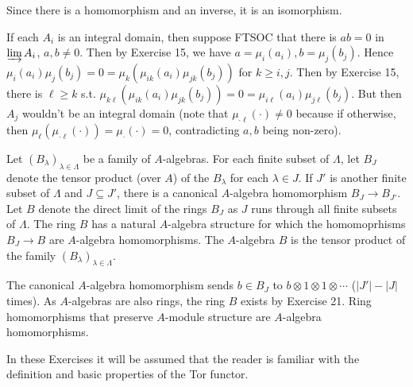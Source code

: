 \begin{questions}
\begin{solution}
		Since there is a homomorphism and an inverse, it is an isomorphism.

		If each $A_i$ is an integral domain, then suppose FTSOC that there is $ab = 0$ in $\varinjlim A_i $, $a,b\ne 0$.
		Then by Exercise 15, we have $a = \mu_i(a_i),b=\mu_j(b_j)$.
		Hence $\mu _i(a_i)\mu _j(b_j) = 0 = \mu _k(\mu _{ik}(a_i)\mu _{jk}(b_j))$ for $k\ge i,j$.
		Then by Exercise 15, there is $\ell\ge k$ s.t. $\mu _{k\ell}(\mu _{ik}(a_i)\mu _{jk}(b_j)) = 0 = \mu _{i\ell}(a_i)\mu _{j\ell}(b_j)$.
		But then $A_j$ wouldn't be an integral domain (note that $\mu _{\cdot \ell}(\cdot) \ne 0$ because if otherwise, then $\mu _\ell(\mu _{\cdot \ell}(\cdot)) = \mu_{\cdot}(\cdot) = 0$, contradicting $a,b$ being non-zero).
	\end{solution}

	\question Let $(B_{\lambda })_{\lambda \in \Lambda}$ be a family of $A$-algebras. For each finite subset of $\Lambda $, let $B_J$ denote the tensor product (over $A $) of the $B_{\lambda}$ for each $\lambda \in J$. If $J'$ is another finite subset of $\Lambda$ and $J\subseteq J' $, there is a canonical $A$-algebra homomorphism $B_J\to B_{J'}$. Let $B$ denote the direct limit of the rings $B_J$ as $J$ runs through all finite subsets of $\Lambda$. The ring $B$ has a natural $A$-algebra structure for which the homomoprhisms $B_J\to B$ are $A$-algebra homomorphisms. The $A$-algebra $B$ is the tensor product of the family $(B_{\lambda})_{\lambda\in \Lambda}$.
	\begin{solution}
		The canonical $A$-algebra homomorphism sends $b\in B_J$ to $b \otimes 1 \otimes 1 \otimes \cdots$ ($|J'| - |J|$ times).
		As $A$-algebras are also rings, the ring $B$ exists by Exercise 21.
		Ring homomorphisms that preserve $A$-module structure are $A$-algebra homomorphisms.
	\end{solution}

	\question In these Exercises it will be assumed that the reader is familiar with the definition and basic properties of the Tor functor.


\end{questions}
